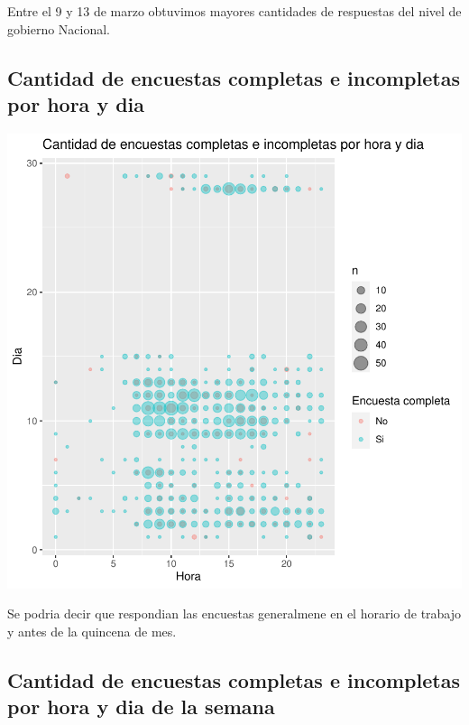 \documentclass{article}
\begin{document}
Entre el 9 y 13 de marzo obtuvimos mayores cantidades de respuestas del nivel de gobierno Nacional.

\subsection{Cantidad de encuestas completas e incompletas por hora y dia}

\includegraphics{seguimientov3-039}

Se podria decir que respondian las encuestas generalmene en el horario de trabajo y antes de la quincena de mes.

\subsection{Cantidad de encuestas completas e incompletas por hora y dia de la semana}
\end{document}
